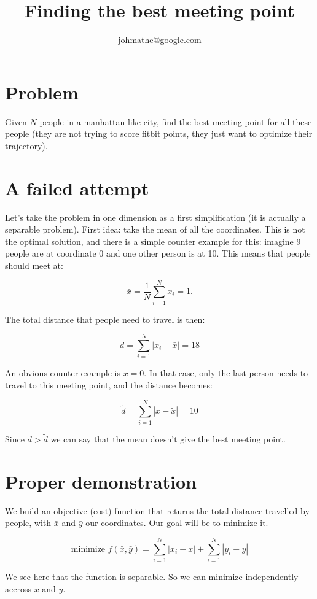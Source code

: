 \documentclass[english]{article}
\begin{document}
\title{Finding the best meeting point}
\author{johmathe@google.com}
\maketitle

\section{Problem}

Given $N$ people in a manhattan-like city, find the best meeting
point for all these people (they are not trying to score fitbit points,
they just want to optimize their trajectory).


\section{A failed attempt}

Let's take the problem in one dimension as a first simplification
(it is actually a separable problem). First idea: take the mean of
all the coordinates. This is not the optimal solution, and there is
a simple counter example for this: imagine 9 people are at coordinate
0 and one other person is at 10. This means that people should meet
at:

\[
\bar{x}=\frac{1}{N}\sum_{i=1}^{N}x_{i}=1.
\]


The total distance that people need to travel is then:

\[
d=\sum_{i=1}^{N}|x_{i}-\bar{x}|=18
\]


An obvious counter example is $\tilde{x}=0$. In that case, only the
last person needs to travel to this meeting point, and the distance
becomes:

\[
\tilde{d}=\sum_{i=1}^{N}|x-\tilde{x}|=10
\]


Since $d>\tilde{d}$ we can say that the mean doesn't give the best
meeting point.


\section{Proper demonstration}

We build an objective (cost) function that returns the total distance
travelled by people, with $\bar{x}$ and $\bar{y}$ our coordinates.
Our goal will be to minimize it.

\[
\mbox{minimize }f(\bar{x},\bar{y})=\sum_{i=1}^{N}|x_{i}-x|+\sum_{i=1}^{N}|y_{i}-y|
\]


We see here that the function is separable. So we can minimize independently
accross $\bar{x}$ and $\bar{y}$. 
\end{document}
